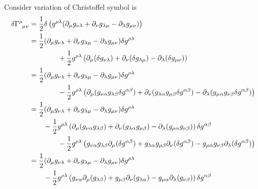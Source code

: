 \documentclass{article}
\theoremstyle{definition}
\def\t{\tensor}
\begin{document}
Consider variation of Christoffel symbol is
\begin{align} 
    \delta \t{\Gamma}{^\rho_\mu_\nu} &= \frac{1}{2} \delta \left( g^{\rho \lambda} (\partial_\mu g_{\nu\lambda} + \partial_\nu g_{\lambda\mu} -\partial_\lambda g_{\mu\nu}) \right)  \\
                                     &= \frac{1}{2} (\partial_\mu g_{\nu\lambda} + \partial_\nu g_{\lambda\mu} -\partial_\lambda g_{\mu\nu})\delta g^{\rho\lambda} \nonumber \\
                                     & \qquad \qquad + \frac{1}{2} g^{\rho \lambda} \left(\partial_\mu (\delta g_{\nu\lambda}) + \partial_\nu (\delta g_{\lambda\mu}) -\partial_\lambda (\delta g_{\mu\nu}) \right)   \\
                                     &= \frac{1}{2} (\partial_\mu g_{\nu\lambda} + \partial_\nu g_{\lambda\mu} -\partial_\lambda g_{\mu\nu})\delta g^{\rho\lambda} \nonumber \\
                                     & \qquad \qquad - \frac{1}{2} g^{\rho \lambda} \left(\partial_\mu (g_{\nu \alpha} g_{\lambda \beta} \delta g^{\alpha\beta}) + \partial_\nu (g_{\lambda\alpha} g_{\mu \beta}\delta g^{\alpha\beta}) -\partial_\lambda (g_{\mu\alpha} g_{\nu\beta}\delta g^{\alpha\beta}) \right)  \\
                                     &= \frac{1}{2} (\partial_\mu g_{\nu\lambda} + \partial_\nu g_{\lambda\mu} -\partial_\lambda g_{\mu\nu})\delta g^{\rho\lambda} \nonumber \\
                                     & \qquad - \frac{1}{2} g^{\rho \lambda} \left(\partial_\mu (g_{\nu \alpha} g_{\lambda \beta} ) + \partial_\nu (g_{\lambda\alpha} g_{\mu \beta}) -\partial_\lambda (g_{\mu\alpha} g_{\nu\beta}) \right)\delta g^{\alpha\beta} \nonumber \\
                                     & \qquad \qquad - \frac{1}{2} g^{\rho \lambda} \left(g_{\nu \alpha} g_{\lambda \beta}\partial_\mu ( \delta g^{\alpha\beta}) + g_{\lambda\alpha} g_{\mu \beta}\partial_\nu (\delta g^{\alpha\beta}) - g_{\mu\alpha} g_{\nu\beta} \partial_\lambda (\delta g^{\alpha\beta}) \right)   \\
                                     &= \frac{1}{2} (\partial_\mu g_{\nu\lambda} + \partial_\nu g_{\lambda\mu} -\partial_\lambda g_{\mu\nu})\delta g^{\rho\lambda} \nonumber \\
                                     & \qquad - \frac{1}{2} g^{\rho \lambda} \left(g_{\nu \alpha}\partial_\mu ( g_{\lambda \beta} ) + g_{\mu \beta} \partial_\nu (g_{\lambda\alpha} ) - g_{\mu\alpha} \partial_\lambda ( g_{\nu\beta}) \right)\delta g^{\alpha\beta} \nonumber \\

\end{align}
\end{document}
